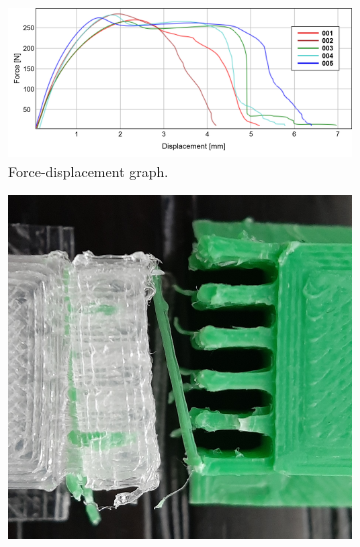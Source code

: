 \begin{figure}
	\centering
	\begin{subfigure}[B]{.99\columnwidth}
		\centering
		\includegraphics[width=\columnwidth]{sources/testing/force_displacement_J.png}
		\caption{Force-displacement graph.}
		\label{fig:force-displacement_straight}
	\end{subfigure}
\setlength{\figwidth}{.19\columnwidth}
	\begin{subfigure}[B]{.99\columnwidth}
		\centering
		\includegraphics[width=\figwidth]{sources/testing/j1_cropped.jpg}

\end{subfigure}
\end{figure}
